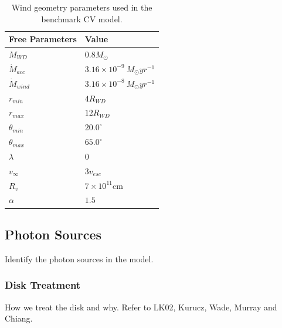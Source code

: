 \documentclass[preprint, a4paper, 11pt]{aastex}
\begin{document}
\begin{table}
\centering
\begin{tabular}{p{3cm}p{4cm}}
\hline Free Parameters 	&	 Value \\ 
\hline \hline 
$M_{WD}$ 	 &	 $0.8 M_{\odot}$ \\ 
$\dot{M}_{acc}$ 	 &	 $3.16\times 10^{-9}~M_{\odot}yr^{-1}$\\ 
$\dot{M}_{wind}$  &	$3.16\times 10^{-8}~M_{\odot}yr^{-1}$\\ 
$r_{min}$ 	&	 $4 R_{WD}$\\ 
$r_{max}$ 	&	 $12 R_{WD}$ \\ 
$\theta_{min}$ 	&	 $20.0^{\circ}$ \\ 
$\theta_{max}$ 	&	 $65.0^{\circ}$ \\ 
$\lambda$ 	&	 $0$ \\ 
$v_{\infty}$ 	&	 $3v_{esc}$ \\ 
$R_v$ 	        &	 $7\times10^{11}$cm \\ 
$\alpha$ 	&	 $1.5$ \\
\end{tabular}
\centering
\caption{Wind geometry parameters used in the benchmark CV model.}
\label{wind_param}
\end{table}

\subsection{Photon Sources}

Identify the photon sources in the model.

\subsubsection{Disk Treatment}
How we treat the disk and why. Refer to LK02, Kurucz, Wade, Murray and Chiang.
\end{document}
